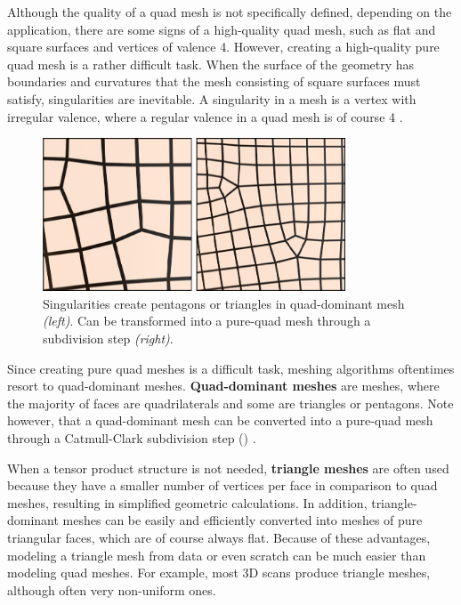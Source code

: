 \documentclass{ACGSeminar}
\begin{document}
Although the quality of a quad mesh is not specifically defined, depending on the application, there are some signs of a high-quality quad mesh, such as flat and square surfaces and vertices of valence 4. However, creating a high-quality pure quad mesh is a rather difficult task. When the surface of the geometry has boundaries and curvatures that the mesh consisting of square surfaces must satisfy, singularities are inevitable. A singularity in a mesh is a vertex with irregular valence, where a regular valence in a quad mesh is of course 4 \cite{fogg2017simple,fogg2018singularities}.

\begin{figure}[htb!]
	\begin{centering}
		\includegraphics[width=9cm]{img/Singularities.png}\par
	\end{centering}
	\caption{Singularities create pentagons or triangles in quad-dominant mesh \textit{(left)}. Can be transformed into a pure-quad mesh through a subdivision step \textit{(right)}. \cite{jakob2015instant}}
	\label{fig:singularities}
\end{figure}

Since creating pure quad meshes is a difficult task, meshing algorithms oftentimes resort to quad-dominant meshes. \textbf{Quad-dominant meshes} are meshes, where the majority of faces are quadrilaterals and some are triangles or pentagons. Note however, that a quad-dominant mesh can be converted into a pure-quad mesh through a Catmull-Clark subdivision step (\cite{catmull1978recursively}) \cite{jakob2015instant}.\bigskip

When a tensor product structure is not needed, \textbf{triangle meshes} are often used because they have a smaller number of vertices per face in comparison to quad meshes, resulting in simplified geometric calculations. In addition, triangle-dominant meshes can be easily and efficiently converted into meshes of pure triangular faces, which are of course always flat. Because of these advantages, modeling a triangle mesh from data or even scratch can be much easier than modeling quad meshes. For example, most 3D scans produce triangle meshes, although often very non-uniform ones.\bigskip
\end{document}
